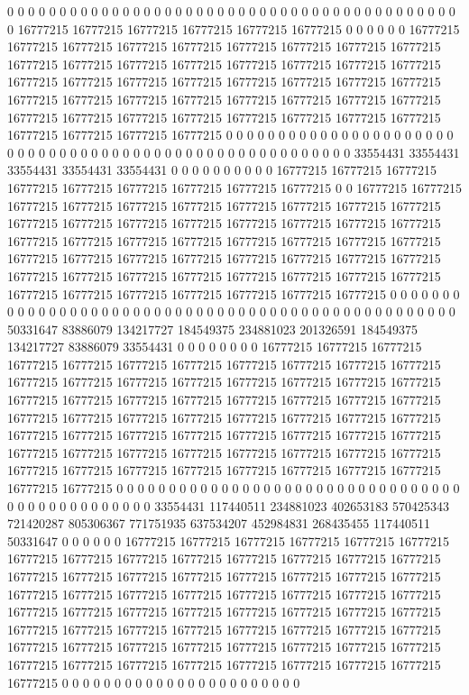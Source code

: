 0 0 0 0 0 0 0 0 0 0 0 0 0 0 0 0 0 0 0 0 0 0 0 0 0 0 0 0 0 0 0 0 0 0 0 0 0 0 0 0 0 0 0 0 16777215 16777215 16777215 16777215 16777215 16777215 0 0 0 0 0 0 16777215 16777215 16777215 16777215 16777215 16777215 16777215 16777215 16777215 16777215 16777215 16777215 16777215 16777215 16777215 16777215 16777215 16777215 16777215 16777215 16777215 16777215 16777215 16777215 16777215 16777215 16777215 16777215 16777215 16777215 16777215 16777215 16777215 16777215 16777215 16777215 16777215 16777215 16777215 16777215 16777215 16777215 16777215 16777215 16777215 0 0 0 0 0 0 0 0 0 0 0 0 0 0 0 0 0 0 0 0 0 0 0 0 0 0 0
0 0 0 0 0 0 0 0 0 0 0 0 0 0 0 0 0 0 0 0 0 0 0 0 0 0 0 0 33554431 33554431 33554431 33554431 33554431 0 0 0 0 0 0 0 0 0 0 16777215 16777215 16777215 16777215 16777215 16777215 16777215 16777215 16777215 0 0 16777215 16777215 16777215 16777215 16777215 16777215 16777215 16777215 16777215 16777215 16777215 16777215 16777215 16777215 16777215 16777215 16777215 16777215 16777215 16777215 16777215 16777215 16777215 16777215 16777215 16777215 16777215 16777215 16777215 16777215 16777215 16777215 16777215 16777215 16777215 16777215 16777215 16777215 16777215 16777215 16777215 16777215 16777215 16777215 16777215 16777215 16777215 16777215 16777215 0 0 0 0 0 0 0 0 0 0 0 0 0 0 0 0 0 0 0 0 0 0 0 0 0
0 0 0 0 0 0 0 0 0 0 0 0 0 0 0 0 0 0 0 0 0 0 0 0 0 50331647 83886079 134217727 184549375 234881023 201326591 184549375 134217727 83886079 33554431 0 0 0 0 0 0 0 0 16777215 16777215 16777215 16777215 16777215 16777215 16777215 16777215 16777215 16777215 16777215 16777215 16777215 16777215 16777215 16777215 16777215 16777215 16777215 16777215 16777215 16777215 16777215 16777215 16777215 16777215 16777215 16777215 16777215 16777215 16777215 16777215 16777215 16777215 16777215 16777215 16777215 16777215 16777215 16777215 16777215 16777215 16777215 16777215 16777215 16777215 16777215 16777215 16777215 16777215 16777215 16777215 16777215 16777215 16777215 16777215 16777215 16777215 16777215 16777215 16777215 0 0 0 0 0 0 0 0 0 0 0 0 0 0 0 0 0 0 0 0 0 0 0 0
0 0 0 0 0 0 0 0 0 0 0 0 0 0 0 0 0 0 0 0 0 0 0 33554431 117440511 234881023 402653183 570425343 721420287 805306367 771751935 637534207 452984831 268435455 117440511 50331647 0 0 0 0 0 0 16777215 16777215 16777215 16777215 16777215 16777215 16777215 16777215 16777215 16777215 16777215 16777215 16777215 16777215 16777215 16777215 16777215 16777215 16777215 16777215 16777215 16777215 16777215 16777215 16777215 16777215 16777215 16777215 16777215 16777215 16777215 16777215 16777215 16777215 16777215 16777215 16777215 16777215 16777215 16777215 16777215 16777215 16777215 16777215 16777215 16777215 16777215 16777215 16777215 16777215 16777215 16777215 16777215 16777215 16777215 16777215 16777215 16777215 16777215 16777215 16777215 16777215 16777215 0 0 0 0 0 0 0 0 0 0 0 0 0 0 0 0 0 0 0 0 0 0 0
